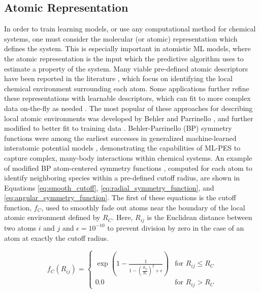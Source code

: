 \subsection{Atomic Representation}
\label{subsec:ML_atomic_representation}
In order to train learning models, or use any computational method for chemical systems, one must consider the molecular (or atomic) representation which defines the system. 
This is especially important in atomistic ML models, where the atomic representation is the input which the predictive algorithm uses to estimate a property of the system.
Many viable pre-defined atomic descriptors have been reported in the literature \cite{atom_centered_symmetry_function_behler, PIP_NN, DeePMD, esders_atomic_NNP}, which focus on identifying the local chemical environment surrounding each atom. 
Some applications further refine these representations with learnable descriptors, which can fit to more complex data on-the-fly as needed \cite{wACSF, SchNet, PhysNet, AIMNet_NSE, NequIP, interatomic_descriptors_kabylda}.
The most popular of these approaches for describing local atomic environments was developed by Behler and Parrinello \cite{atom_centered_symmetry_function_behler}, and further modified to better fit to training data \cite{TensorMol, ani-1}.
Behler-Parrinello (BP) symmetry functions were among the earliest successes in generalized machine-learned interatomic potential models \cite{behler_parrinello}, demonstrating the capabilities of ML-PES to capture complex, many-body interactions within chemical systems.
An example of modified BP atom-centered symmetry functions \cite{ani-1}, computed for each atom to identify neighboring species within a pre-defined cutoff radius, are shown in Equations \ref{eq:smooth_cutoff}, \ref{eq:radial_symmetry_function}, and \ref{eq:angular_symmetry_function}. 
The first of these equations is the cutoff function, $f_C$, used to smoothly fade out atoms near the boundary of the local atomic environment defined by $R_C$. Here, $R_{ij}$ is the Euclidean distance between two atoms $i$ and $j$ and $\epsilon = 10^{-10}$ to prevent division by zero in the case of an atom at exactly the cutoff radius. 

\begin{equation}
f_C(R_{ij}) = 
\begin{cases} 
\exp \left(1 - \frac{1}{1 - \left(\frac{R_{ij}}{R_c}\right)^{2} + \epsilon} \right) & \text{for } R_{ij} \leq R_C \\
0.0 & \text{for } R_{ij} > R_C 
\end{cases}
\label{eq:smooth_cutoff}
\end{equation}

